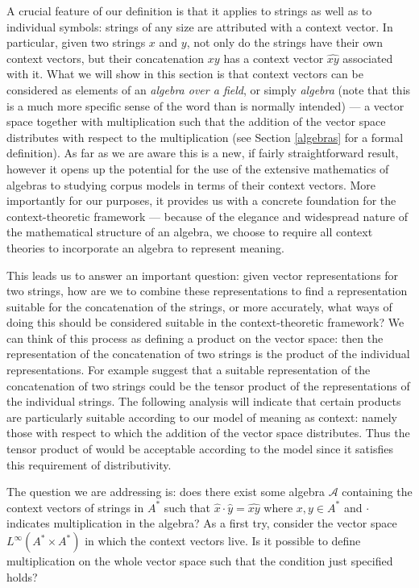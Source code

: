 A crucial feature of our definition is that it applies to strings as well as to individual symbols: strings of any size are attributed with a context vector. In particular, given two strings $x$ and $y$, not only do the strings have their own context vectors, but their concatenation $xy$ has a context vector $\widehat{xy}$ associated with it.  What we will show in this section is that context vectors can be considered as elements of an \emph{algebra over a field}, or simply \emph{algebra} (note that this is a much more specific sense of the word than is normally intended) --- a vector space together with multiplication such that the addition of the vector space distributes with respect to the multiplication (see Section \ref{algebras} for a formal definition). As far as we are aware this is a new, if fairly straightforward result, however it opens up the potential for the use of the extensive mathematics of algebras to studying corpus models in terms of their context vectors. More importantly for our purposes, it provides us with a concrete foundation for the context-theoretic framework --- because of the elegance and widespread nature of the mathematical structure of an algebra, we choose to require all context theories to incorporate an algebra to represent meaning.

This leads us to answer an important question: given vector representations for two strings, how are we to combine these representations to find a representation suitable for the concatenation of the strings, or more accurately, what ways of doing this should be considered suitable in the context-theoretic framework? We can think of this process as defining a product on the vector space: then the representation of the concatenation of two strings is the product of the individual representations. For example \cite{Clark:07} suggest that a suitable representation of the concatenation of two strings could be the tensor product of the representations of the individual strings. The following analysis will indicate that certain products are particularly suitable according to our model of meaning as context: namely those with respect to which the addition of the vector space distributes. Thus the tensor product of \citeauthor{Clark:07} would be acceptable according to the model since it satisfies this requirement of distributivity.


The question we are addressing is: does there exist some algebra $\mathcal{A}$ containing the context vectors of strings in $A^*$ such that $\hat{x}\cdot \hat{y} = \widehat{xy}$ where $x,y\in A^*$ and $\cdot$ indicates multiplication in the algebra? As a first try, consider the vector space $L^\infty(A^*\times A^*)$ in which the context vectors live. Is it possible to define multiplication on the whole vector space such that the condition just specified holds?


